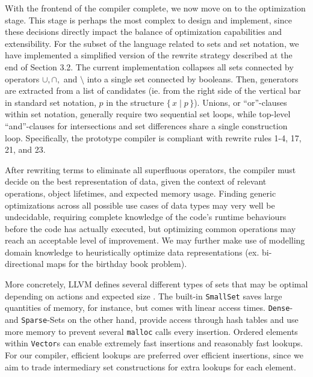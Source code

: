 \documentclass{article}
\newcommand{\Set}[2]{%
  \{\, #1 \mid #2 \, \}%
}
\begin{document}
With the frontend of the compiler complete, we now move on to the optimization stage. This stage is perhaps the most complex to design and implement, since these decisions directly impact the balance of optimization capabilities and extensibility. For the subset of the language related to sets and set notation, we have implemented a simplified version of the rewrite strategy described at the end of Section 3.2. The current implementation collapses all sets connected by operators $\cup, \cap,$ and $\setminus$ into a single set connected by booleans. Then, generators are extracted from a list of candidates (ie. from the right side of the vertical bar in standard set notation, $p$ in the structure $\Set{x}{p}$). Unions, or ``or''-clauses within set notation, generally require two sequential set loops, while top-level ``and''-clauses for intersections and set differences share a single construction loop. Specifically, the prototype compiler is compliant with rewrite rules 1-4, 17, 21, and 23.



After rewriting terms to eliminate all superfluous operators, the compiler must decide on the best representation of data, given the context of relevant operations, object lifetimes, and expected memory usage. Finding generic optimizations across all possible use cases of data types may very well be undecidable, requiring complete knowledge of the code's runtime behaviours before the code has actually executed, but optimizing common operations may reach an acceptable level of improvement. We may further make use of modelling domain knowledge to heuristically optimize data representations (ex. bi-directional maps for the birthday book problem).

More concretely, LLVM defines several different types of sets that may be optimal depending on actions and expected size \cite{llvmSetDocs}. The built-in \texttt{SmallSet} saves large quantities of memory, for instance, but comes with linear access times. \texttt{Dense}- and \texttt{Sparse}-Sets on the other hand, provide access through hash tables and use more memory to prevent several \texttt{malloc} calls every insertion. Ordered elements within \texttt{Vector}s can enable extremely fast insertions and reasonably fast lookups. For our compiler, efficient lookups are preferred over efficient insertions, since we aim to trade intermediary set constructions for extra lookups for each element.
\end{document}
